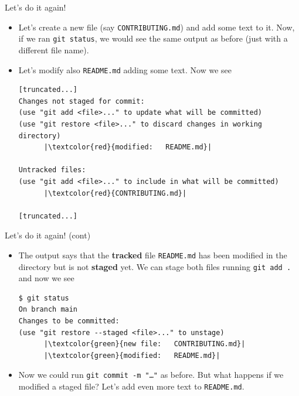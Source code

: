 \documentclass[
hyperref={bookmarks=false},
xcolor={dvipsnames,svgnames*,x11names*}, 
12pt
]{beamer}
\begin{document}
\begin{frame}[fragile]{Let's do it again!}
\vspace{-0.5cm}
\begin{itemize}
\itemsep 2ex
\item Let's create a new file (say \texttt{CONTRIBUTING.md}) and add some text to it. Now, if we ran \texttt{git status}, we would see the same output as before (just with a different file name). 
\item Let's modify also \texttt{README.md} adding some text. Now we see
\begin{lstlisting}
[truncated...]
Changes not staged for commit:
(use "git add <file>..." to update what will be committed)
(use "git restore <file>..." to discard changes in working directory)
      |\textcolor{red}{modified:   README.md}|

Untracked files:
(use "git add <file>..." to include in what will be committed)
      |\textcolor{red}{CONTRIBUTING.md}|

[truncated...]
\end{lstlisting}
\end{itemize}
\end{frame}

\begin{frame}[fragile]{Let's do it again! (cont)}
\vspace{-0.5cm}
\begin{itemize}
\itemsep 2ex
\item The output says that the \textbf{tracked} file \texttt{README.md} has been modified in the directory but is not \textbf{staged} yet. We can stage both files running \texttt{git add .} and now we see
\begin{lstlisting}
$ git status
On branch main
Changes to be committed:
(use "git restore --staged <file>..." to unstage)
      |\textcolor{green}{new file:   CONTRIBUTING.md}|
      |\textcolor{green}{modified:   README.md}|
\end{lstlisting}

\item Now we could run \texttt{git commit -m "\dots"} as before. But what happens if we modified a staged file? Let's add even more text to \texttt{README.md}. 
\end{itemize}
\end{frame}
\end{document}
